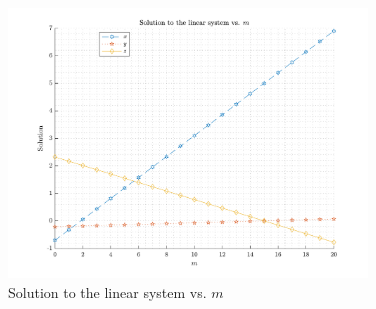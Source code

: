 \begin{figure}[!hbtp]
  \centering
  \includegraphics[width=0.85\textwidth]{../Math.3341.Lab.06.ans/lab_06_plot.pdf}
  \caption{Solution to the linear system vs. $m$}
  \label{fig:solution}
\end{figure}
